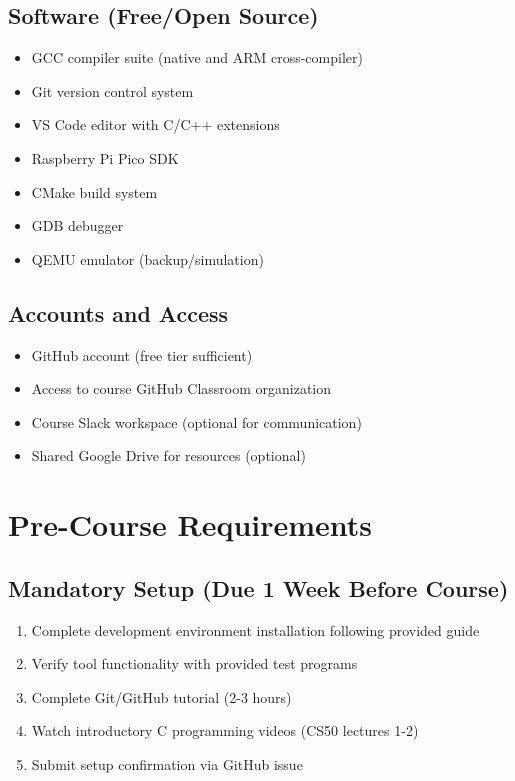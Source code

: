\documentclass[11pt,a4paper]{article}
\begin{document}
\subsection{Software (Free/Open Source)}
\begin{itemize}
    \item GCC compiler suite (native and ARM cross-compiler)
    \item Git version control system
    \item VS Code editor with C/C++ extensions
    \item Raspberry Pi Pico SDK
    \item CMake build system
    \item GDB debugger
    \item QEMU emulator (backup/simulation)
\end{itemize}

\subsection{Accounts and Access}
\begin{itemize}
    \item GitHub account (free tier sufficient)
    \item Access to course GitHub Classroom organization
    \item Course Slack workspace (optional for communication)
    \item Shared Google Drive for resources (optional)
\end{itemize}

\section{Pre-Course Requirements}

\subsection{Mandatory Setup (Due 1 Week Before Course)}
\begin{enumerate}
    \item Complete development environment installation following provided guide
    \item Verify tool functionality with provided test programs
    \item Complete Git/GitHub tutorial (2-3 hours)
    \item Watch introductory C programming videos (CS50 lectures 1-2)
    \item Submit setup confirmation via GitHub issue
\end{enumerate}
\end{document}
